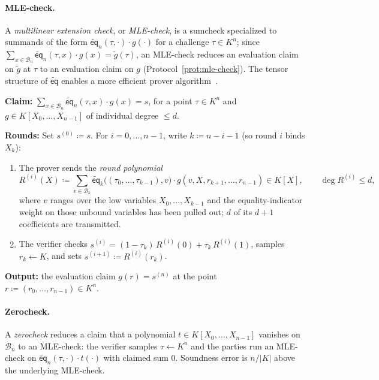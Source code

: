 \documentclass{article}
\theoremstyle{definition}
\newcommand*{\mle}{\widetilde}
\newcommand{\eq}{\mathsf{eq}}
\newcommand{\BB}{\mathcal{B}}
\begin{document}
\paragraph{MLE-check.}
A \emph{multilinear extension check}, or \emph{MLE-check}, is a sumcheck specialized to summands of the form $\mle{\eq}_n(\tau, \cdot) \cdot g(\cdot)$ for a challenge $\tau \in K^n$; since $\sum_{x \in \BB_n} \mle{\eq}_n(\tau, x) \cdot g(x) = \mle{g}(\tau)$, an MLE-check reduces an evaluation claim on $\mle{g}$ at $\tau$ to an evaluation claim on $g$ (Protocol~\ref{prot:mle-check}). The tensor structure of $\mle{\eq}$ enables a more efficient prover algorithm~\cite[\S 3]{Gruen:2024aa}.

\begin{protocol}
\label{prot:mle-check}
\textbf{Claim:} $\sum_{x \in \BB_n} \mle{\eq}_n(\tau, x) \cdot g(x) = s$, for a point $\tau \in K^n$ and $g \in K[X_0, \ldots, X_{n - 1}]$ of individual degree $\le d$.

\textbf{Rounds:} Set $s^{(0)} \coloneqq s$. For $i = 0, \ldots, n - 1$, write $k \coloneqq n - i - 1$ (so round $i$ binds $X_k$):
\begin{enumerate}
\item The prover sends the \emph{round polynomial}
\[
  R^{(i)}(X) \coloneqq \sum_{v \in \BB_k} \mle{\eq}_k\bigl( (\tau_0, \ldots, \tau_{k - 1}), v \bigr) \cdot g(v, X, r_{k + 1}, \ldots, r_{n - 1}) \in K[X], \qquad \deg R^{(i)} \le d,
\]
where $v$ ranges over the low variables $X_0, \ldots, X_{k - 1}$ and the equality-indicator weight on those unbound variables has been pulled out; $d$ of its $d + 1$ coefficients are transmitted.
\item The verifier checks $s^{(i)} = (1 - \tau_k)\, R^{(i)}(0) + \tau_k\, R^{(i)}(1)$, samples $r_k \gets K$, and sets $s^{(i + 1)} \coloneqq R^{(i)}(r_k)$.
\end{enumerate}

\textbf{Output:} the evaluation claim $g(r) = s^{(n)}$ at the point $r \coloneqq (r_0, \ldots, r_{n - 1}) \in K^n$.
\end{protocol}

\paragraph{Zerocheck.}
A \emph{zerocheck} reduces a claim that a polynomial $t \in K[X_0, \ldots, X_{n - 1}]$ vanishes on $\BB_n$ to an MLE-check: the verifier samples $\tau \gets K^n$ and the parties run an MLE-check on $\mle{\eq}_n(\tau, \cdot) \cdot t(\cdot)$ with claimed sum $0$. Soundness error is $n / |K|$ above the underlying MLE-check.
\end{document}

